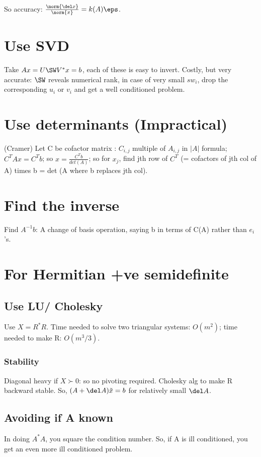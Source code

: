 \documentclass[oneside, article]{memoir}
\begin{document}
So accuracy: $\frac{\norm{\del x}}{\norm{x}}=k(A)\eps$.

\section{Use SVD}
Take $Ax = U\SW V^{*} x = b$, each of these is easy to invert. Costly, but very accurate: $\SW$ reveals numerical rank, in case of very small $sw_{i}$, drop the corresponding $u_{i}$ or $v_{i}$ and get a well conditioned problem.

\section{Use determinants (Impractical)}
(Cramer) Let C be cofactor matrix : $C_{i,j}$ multiple of $A_{i,j}$ in $|A|$ formula; $C^{T}Ax = C^{T}b$; so $x = \frac{C^{T}b}{det(A)}$; so for $x_{j}$, find jth row of $C^{T}$ (= cofactors of jth col of A) times b = det (A where b replaces jth col).

\section{Find the inverse}
Find $A^{-1}b$: A change of basis operation, saying b in terms of C(A) rather than $e_{i}$'s.

\section{For Hermitian +ve semidefinite }
\subsection{Use LU/ Cholesky}
Use $X = R^{*}R$. Time needed to solve two triangular systems: $O(m^{2})$; time needed to make R: $O(m^{3}/3)$.

\subsubsection{Stability}
Diagonal heavy if $X \succ 0$: so no pivoting required. \why Cholesky alg to make R backward stable. So, $(A+\del A) \tilde{x} = b$ for relatively small $\del A$.

\subsection{Avoiding  if A known}
In doing $A^{*}A$, you square the condition number. So, if A is ill conditioned, you get an even more ill conditioned problem.
\end{document}
